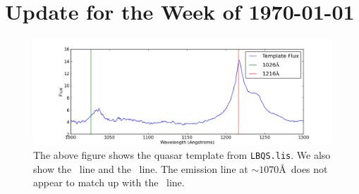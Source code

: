 \documentclass[11pt]{article}
\begin{document}
\section*{Update for the Week of \today}

\begin{figure}[h]
  \centering
  \includegraphics[width=15cm]{QSOTemplateCheck.png}
  \caption{The above figure shows the quasar template from {\tt LBQS.lis}. We also show the \lya\ line and the \lyb\ line. The emission line at $\sim 1070$\AA\ does not appear to match up with the \lyb\ line.}
  \label{fig:todo}
\end{figure}
\end{document}
